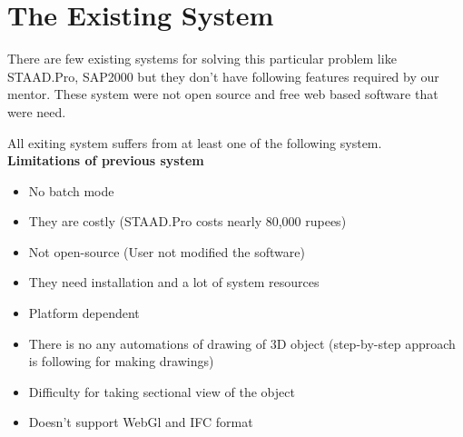 
\section{The Existing System}
There are few existing systems for solving this particular problem like STAAD.Pro, SAP2000 but
they don’t have following features required by our mentor. These system were not open source
and free web based software that were need.

All exiting system suffers from at least one of the following system.\\
\textbf{Limitations of previous system}
\begin{itemize}
\item No batch mode
\item They are costly (STAAD.Pro costs nearly 80,000 rupees)
\item Not open-source (User not modified the software)
\item They need installation and a lot of system resources
\item Platform dependent
\item There is no any automations of drawing of 3D object (step-by-step approach is following for making drawings)
\item Difficulty for taking sectional view of the object
\item Doesn't support WebGl and IFC format
\end{itemize}

